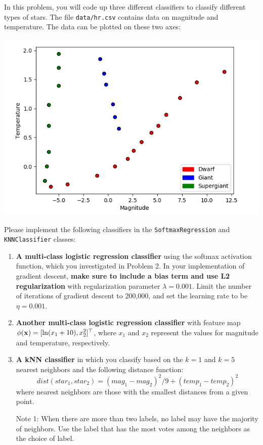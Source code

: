 \documentclass[submit]{harvardml}
\begin{document}
\begin{problem}
In this problem, you will code up three different classifiers to classify different types of stars. The file \verb|data/hr.csv| contains data on magnitude and temperature. The data can be plotted on these two axes:
\begin{center}
\includegraphics[width=.5\textwidth]{images/star.png}
\end{center}

Please implement the following classifiers in the \verb|SoftmaxRegression| and \verb|KNNClassifier| classes:

\begin{enumerate}[label=\alph*)]

\item \textbf{A multi-class logistic regression classifier} using the softmax activation function, which you investigated in Problem 2. In your implementation of gradient descent, \textbf{make sure to include a bias term and use L2 regularization} with regularization parameter $\lambda = 0.001$. Limit the number of iterations of gradient descent to 200,000, and set the learning rate to be $\eta = 0.001$.

\item \textbf{Another multi-class logistic regression classifier} with feature map $\phi(\mathbf{x}) = [\ln (x_1 + 10), x_2^2]^\top$, where $x_1$ and $x_2$ represent the values for magnitude and temperature, respectively.

\item \textbf{A kNN classifier} in which you classify based on the $k = 1$ and $k = 5$ nearest neighbors and the following distance function: $$dist(star_1, star_2) = (mag_1 - mag_2)^2/9 + (temp_1 - temp_2)^2$$
where nearest neighbors are those with the smallest distances from a given point.

  Note 1: When there are more than two labels, no label may have the
  majority of neighbors.  Use the label that has the most votes among
  the neighbors as the choice of label. 


\end{enumerate}
\end{problem}
\end{document}
